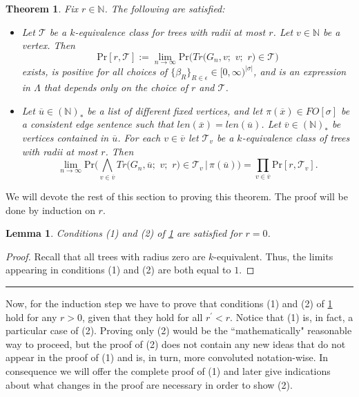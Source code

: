 \documentclass[12pt,notitlepage,a4paper]{article}
\newtheorem{theorem}{Theorem}[section]
\newtheorem{lemma}{Lemma}[section]
\theoremstyle{definition}
\newcommand{\N}{\mathbb{N}}
\newcommand{\Ln}{\lim\limits_{n\to \infty}}
\newcommand{\PR}[1]{\mathrm{Pr}\big(#1\big)}
\newcommand{\sep}{\noindent\rule{2cm}{0.4pt}}
\begin{document}
\begin{theorem} \label{thm:BigTrees}
	Fix $r\in \N$. The following are satisfied:
	\begin{itemize}
		\item[(1)] Let $\mathcal{T}$ be a
		$k$-equivalence class for trees with radii at most $r$. Let
		$v\in \N$ be a vertex.	Then 
		\[
		\mathrm{Pr}[r,\mathcal{T}]:=\Ln  \PR{Tr\big(G_n,v;\,\,v;\,\,r\big)\in \mathcal{T}}
		\]
		exists,
		is positive for all choices of 
		$\{\beta_R\}_{R\in \epsilon}\in [0,\infty)^{|\sigma|}$,
		and is an expression
		in $\Lambda$ that depends only on the choice of $r$ and $\mathcal{T}$.
		\item[(2)] Let $\overline{u}\in (\N)_*$ be a list of different fixed 
		vertices, and let $\pi(\overline{x})\in FO[\sigma]$ be a consistent
		edge sentence such that 
		$len(\overline{x})=len(\overline{u})$.
		Let $\overline{v}\in (\N)_*$ be vertices contained
		in $\overline{u}$. For each $v\in \overline{v}$
		let $\mathcal{T}_v$ be a $k$-equivalence class
		of trees with radii	at most $r$. Then
		\[
		\Ln \mathrm{Pr}\big( \bigwedge_{v\in \overline{v}} 
		Tr\big(G_n, \overline{u};\,\,v;\,\,r\big)\in \mathcal{T}_v 
		\, | \, \pi(\overline{u})
		\big)= \prod_{v\in \overline{v}} \mathrm{Pr}[r,\mathcal{T}_v]. \]	 	
	\end{itemize}
\end{theorem}
	We will devote the rest of this section to proving this
	theorem. The proof will be done by induction on $r$. 
	
\begin{lemma}
	Conditions (1) and (2) of \cref{thm:BigTrees} 
	are satisfied for $r=0$.
\end{lemma}
\begin{proof}
	Recall that	all trees with radius zero are $k$-equivalent. Thus,
	the limits
	appearing in conditions (1) and (2) are both equal to $1$.
\end{proof}
\sep

Now, for the induction step we have to prove that 
conditions (1) and (2) of \cref{thm:BigTrees} hold
for any $r>0$, given that they hold for all
$r^\prime < r$. Notice that (1) is, in fact, a particular
case of (2). Proving only (2) would be the ``mathematically"
reasonable way to proceed, but the proof of (2) does not contain
any new ideas that do not appear in the proof of (1) and is, in turn,
more convoluted notation-wise. In consequence we will offer the complete 
proof of (1) and later give indications about what changes in the proof
are necessary in order to show (2). 
	
\end{document}
